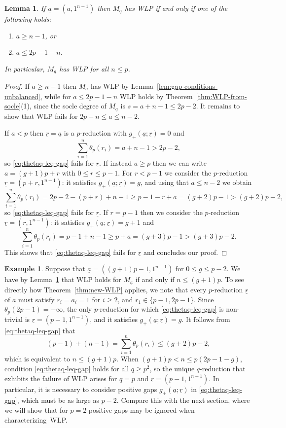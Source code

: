 \documentclass[11pt,reqno]{amsart}
\newcommand{\ul}[1]{\underline{#1}}
\newtheorem{lemma}[theorem]{Lemma}
\theoremstyle{definition}
\newtheorem{example}[theorem]{Example}
\theoremstyle{remark}
\numberwithin{equation}{section}
\begin{document}
\begin{lemma}\label{lem:hooks}
    If $\ul{a}=(a,1^{n-1})$ then $M_{\ul{a}}$ has WLP if and only if one of the following holds:
    \begin{enumerate}
        \item $a\geq n-1$, or
        \item $a\leq 2p-1-n$.
    \end{enumerate}
    In particular,  $M_{\ul{a}}$ has WLP for all $n\leq p$.
\end{lemma}
\begin{proof} If $a\geq n-1$ then $M_{\ul{a}}$ has WLP by Lemma~\ref{lem:gap-conditions-unbalanced}, while for $a\leq 2p-1-n$ WLP holds by Theorem~\ref{thm:WLP-from-socle}(1), since the socle degree of $M_{\ul{a}}$ is $s=a+n-1\leq 2p-2$. It remains to show that WLP fails for $2p-n\leq a\leq n-2$.

If $a<p$ then $\ul{r}=\ul{a}$ is a $p$-reduction with $g_+(\ul{a};\ul{r})=0$ and
\[\sum_{i=1}^n\theta_p(r_i)=a+n-1>2p-2,\]
so \eqref{eq:thetaq-leq-gap} fails for $\ul{r}$. If instead $a\geq p$ then we can write $a=(g+1)p+r$ with $0\leq r\leq p-1$. For $r<p-1$ we consider the $p$-reduction $\ul{r}=(p+r,1^{n-1})$: it satisfies $g_+(\ul{a};\ul{r})=g$, and using that $a\leq n-2$ we obtain
\[\sum_{i=1}^n\theta_p(r_i)=2p-2-(p+r)+n-1\geq p-1-r+a=(g+2)p-1>(g+2)p-2,\]
so \eqref{eq:thetaq-leq-gap} fails for $\ul{r}$. If $r=p-1$ then we consider the $p$-reduction $\ul{r}=(r,1^{n-1})$: it satisfies $g_+(\ul{a};\ul{r})=g+1$ and
\[\sum_{i=1}^n\theta_p(r_i)=p-1+n-1\geq p+a=(g+3)p-1>(g+3)p-2.\] 
This shows that \eqref{eq:thetaq-leq-gap} fails for $\ul{r}$ and concludes our proof. 
\end{proof}


\begin{example}\label{ex:unbalanced-reductions-hook}
Suppose that $\ul{a} = ((g+1)p-1,1^{n-1})$ for $0\leq g\leq p-2$. We have by Lemma~\ref{lem:hooks} that WLP holds for $M_{\ul{a}}$ if and only if $n\leq(g+1)p$. To see directly how Theorem~\ref{thm:new-WLP} applies, we note that every $p$-reduction $\ul{r}$ of $\ul{a}$ must satisfy $r_i=a_i=1$ for $i\geq 2$, and $r_1\in\{p-1,2p-1\}$. Since $\theta_p(2p-1)=-\infty$, the only $p$-reduction for which \eqref{eq:thetaq-leq-gap} is non-trivial is $\ul{r}=(p-1,1^{n-1})$, and it satisfies $g_+(\ul{a};\ul{r}) = g$. It follows from \eqref{eq:thetaq-leq-gap} that
\[(p-1)+(n-1) = \sum_{i=1}^n\theta_p(r_i) \leq (g+2)p-2,\]
which is equivalent to $n\leq (g+1)p$. When $(g+1)p<n\leq p(2p-1-g)$, condition \eqref{eq:thetaq-leq-gap} holds for all $q\geq p^2$, so the unique $q$-reduction that exhibits the failure of WLP arises for $q=p$ and $\ul{r}=(p-1,1^{n-1})$. In particular, it is necessary to consider positive gaps $g_+(\ul{a};\ul{r})$ in \eqref{eq:thetaq-leq-gap}, which must be as large as $p-2$. Compare this with the next section, where we will show that for $p=2$ positive gaps may be ignored when characterizing~WLP.
\end{example}
\end{document}
